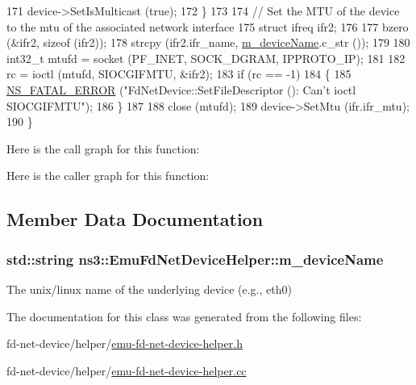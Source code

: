 \begin{DoxyCode}
171       device->SetIsMulticast (\textcolor{keyword}{true});
172     \}
173 
174   \textcolor{comment}{// Set the MTU of the device to the mtu of the associated network interface}
175   \textcolor{keyword}{struct }ifreq ifr2;
176   
177   bzero (&ifr2, \textcolor{keyword}{sizeof} (ifr2));
178   strcpy (ifr2.ifr\_name, \hyperlink{classns3_1_1EmuFdNetDeviceHelper_a5c259590827f139ae1189a99addeca6a}{m\_deviceName}.c\_str ());
179 
180   int32\_t mtufd = socket (PF\_INET, SOCK\_DGRAM, IPPROTO\_IP);
181 
182   rc = ioctl (mtufd, SIOCGIFMTU, &ifr2);
183   \textcolor{keywordflow}{if} (rc == -1)
184     \{
185       \hyperlink{group__fatal_ga5131d5e3f75d7d4cbfd706ac456fdc85}{NS\_FATAL\_ERROR} (\textcolor{stringliteral}{"FdNetDevice::SetFileDescriptor (): Can't ioctl SIOCGIFMTU"});
186     \}
187  
188   close (mtufd);
189   device->SetMtu (ifr.ifr\_mtu);
190 \}
\end{DoxyCode}


Here is the call graph for this function\+:




Here is the caller graph for this function\+:




\subsection{Member Data Documentation}
\subsubsection[{\texorpdfstring{m\+\_\+device\+Name}{m_deviceName}}]{\setlength{\rightskip}{0pt plus 5cm}std\+::string ns3\+::\+Emu\+Fd\+Net\+Device\+Helper\+::m\+\_\+device\+Name\hspace{0.3cm}{\ttfamily [protected]}}\hypertarget{classns3_1_1EmuFdNetDeviceHelper_a5c259590827f139ae1189a99addeca6a}{}\label{classns3_1_1EmuFdNetDeviceHelper_a5c259590827f139ae1189a99addeca6a}
The unix/linux name of the underlying device (e.\+g., eth0) 

The documentation for this class was generated from the following files\+:\begin{DoxyCompactItemize}
\item 
fd-\/net-\/device/helper/\hyperlink{emu-fd-net-device-helper_8h}{emu-\/fd-\/net-\/device-\/helper.\+h}\item 
fd-\/net-\/device/helper/\hyperlink{emu-fd-net-device-helper_8cc}{emu-\/fd-\/net-\/device-\/helper.\+cc}\end{DoxyCompactItemize}
